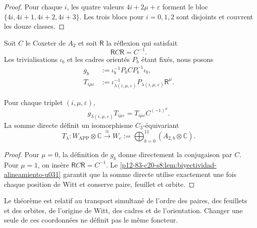 \begin{proof}
Pour chaque \(i\), les quatre valeurs \(4i+2\mu+\varepsilon\) forment le bloc
\(\{4i,4i+1,4i+2,4i+3\}\). Les trois blocs pour \(i=0,1,2\) sont disjoints
et couvrent les douze classes.
\end{proof}

Soit \(C\) le Coxeter de \(A_2\) et soit \(\mathsf R\) la réflexion qui
satisfait
\begin{equation}
 \mathsf R C\mathsf R=C^{-1}.
 \label{p12-83-c20-s8:eq:reflexion-conjuga-coxeter-u031}
\end{equation}
Les trivialisations \(\iota_b\) et les cadres orientés \(P_b\) étant fixés,
nous posons
\begin{align}
 g_b&:=\iota_b^{-1}P_bCP_b^{-1}\iota_b,
 \label{p12-83-c20-s8:eq:coxeter-calibrado-fibra-u031}\\
 T_{i\mu\varepsilon}
 &:=\iota_{\lambda(i,\mu,\varepsilon)}^{-1}
 P_{\lambda(i,\mu,\varepsilon)}\mathsf R^\mu.
 \label{p12-83-c20-s8:eq:entrelazador-fibra-u031}
\end{align}

\begin{theorem}
\label{p12-83-c20-s8:thm:alineamiento-app-witt-u031}
Pour chaque triplet \((i,\mu,\varepsilon)\),
\begin{equation}
 g_{\lambda(i,\mu,\varepsilon)}T_{i\mu\varepsilon}
 =T_{i\mu\varepsilon}C^{(-1)^\mu}.
 \label{p12-83-c20-s8:eq:identidad-entrelazamiento-app-witt-u031}
\end{equation}
La somme directe définit un isomorphisme \(C_3\)-équivariant
\begin{equation}
 T_\lambda:
 W_{\mathrm{APP}}\otimes\mathbb C
 \xrightarrow{\;\cong\;}
 W_c:=\bigoplus_{b=0}^{11}
 (A_{2,b}\otimes\mathbb C).
 \label{p12-83-c20-s8:eq:isomorfismo-app-witt-u031}
\end{equation}
\end{theorem}

\begin{proof}
Pour \(\mu=0\), la définition de \(g_b\) donne directement la conjugaison
par \(C\). Pour \(\mu=1\), on insère
\(\mathsf RC\mathsf R=C^{-1}\). Le
\cref{p12-83-c20-s8:lem:biyectividad-alineamiento-u031} garantit que la somme directe
utilise exactement une fois chaque position de Witt et conserve paire, feuillet et orbite.
\end{proof}

Le théorème est relatif au transport simultané de l'ordre des paires, des feuillets et des
orbites, de l'origine de Witt, des cadres et de l'orientation. Changer une
seule de ces coordonnées ne définit pas le même foncteur.

